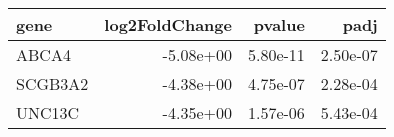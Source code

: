 \begin{tabular}{lrrr}
\toprule
   gene &  log2FoldChange &   pvalue &     padj \\
\midrule
  ABCA4 &       -5.08e+00 & 5.80e-11 & 2.50e-07 \\
SCGB3A2 &       -4.38e+00 & 4.75e-07 & 2.28e-04 \\
 UNC13C &       -4.35e+00 & 1.57e-06 & 5.43e-04 \\
\bottomrule
\end{tabular}
